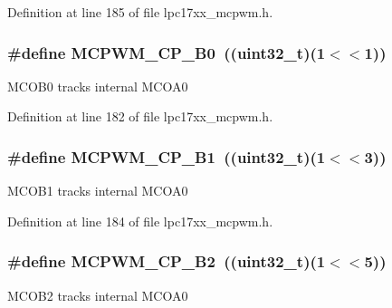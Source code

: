 \-Definition at line 185 of file lpc17xx\-\_\-mcpwm.\-h.

\hypertarget{group___m_c_p_w_m___private___macros_ga3f9bc04425f0082bfaa0304d5dc51a1e}{
\subsubsection[{\-M\-C\-P\-W\-M\-\_\-\-C\-P\-\_\-\-B0}]{\setlength{\rightskip}{0pt plus 5cm}\#define {\bf \-M\-C\-P\-W\-M\-\_\-\-C\-P\-\_\-\-B0}~((uint32\-\_\-t)(1$<$$<$1))}}\label{group___m_c_p_w_m___private___macros_ga3f9bc04425f0082bfaa0304d5dc51a1e}
\-M\-C\-O\-B0 tracks internal \-M\-C\-O\-A0 

\-Definition at line 182 of file lpc17xx\-\_\-mcpwm.\-h.

\hypertarget{group___m_c_p_w_m___private___macros_ga92f7a17b84784809d3cd3f08398a3e35}{
\subsubsection[{\-M\-C\-P\-W\-M\-\_\-\-C\-P\-\_\-\-B1}]{\setlength{\rightskip}{0pt plus 5cm}\#define {\bf \-M\-C\-P\-W\-M\-\_\-\-C\-P\-\_\-\-B1}~((uint32\-\_\-t)(1$<$$<$3))}}\label{group___m_c_p_w_m___private___macros_ga92f7a17b84784809d3cd3f08398a3e35}
\-M\-C\-O\-B1 tracks internal \-M\-C\-O\-A0 

\-Definition at line 184 of file lpc17xx\-\_\-mcpwm.\-h.

\hypertarget{group___m_c_p_w_m___private___macros_gad4e7089d22285c87116612f1ae3abc15}{
\subsubsection[{\-M\-C\-P\-W\-M\-\_\-\-C\-P\-\_\-\-B2}]{\setlength{\rightskip}{0pt plus 5cm}\#define {\bf \-M\-C\-P\-W\-M\-\_\-\-C\-P\-\_\-\-B2}~((uint32\-\_\-t)(1$<$$<$5))}}\label{group___m_c_p_w_m___private___macros_gad4e7089d22285c87116612f1ae3abc15}
\-M\-C\-O\-B2 tracks internal \-M\-C\-O\-A0 

